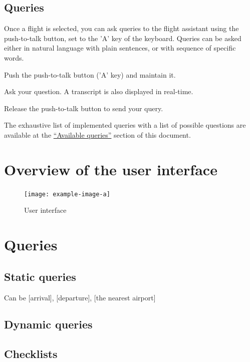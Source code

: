 \documentclass[12pt,oneside,a4]{article}
\let\tempone\itemize
\let\temptwo\enditemize
\renewenvironment{itemize}{\tempone\addtolength{\itemsep}{-0.5\baselineskip}}{\temptwo}
\begin{document}
\subsection{Queries}
Once a flight is selected, you can ask queries to the flight assistant using the push-to-talk button, set to the 'A' key of the keyboard. Queries can be asked either in natural language with plain sentences, or with sequence of specific words.

\begin{itemize}
    \item Push the push-to-talk button ('A' key) and maintain it.
    \item Ask your question. A transcript is also displayed in real-time.
    \item Release the push-to-talk button to send your query.
\end{itemize}

The exhaustive list of implemented queries with a list of possible questions are available at the \hyperref[sec:available-queries]{``Available queries''} section of this document.

\section{Overview of the user interface}
\begin{figure}[h!]
    \centering
    \texttt{[image: example-image-a]}
    \caption{User interface}
    \label{fig:user_interface}
\end{figure}


\section{Queries}
\subsection{Static queries}
Can be [arrival], [departure], [the nearest airport]

\subsection{Dynamic queries}

\subsection{Checklists}
\end{document}
